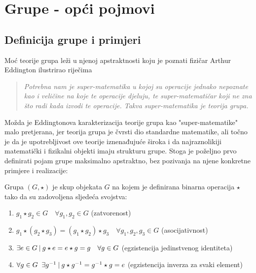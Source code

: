
\chapter{Grupe - opći pojmovi}

\section{Definicija grupe i primjeri}


Moć teorije grupa leži u njenoj apstraktnosti koju je poznati fizičar Arthur
Eddington ilustrirao 
riječima
\begin{quote}
\emph{Potrebna nam je super-matematika u kojoj su operacije jednako nepoznate kao i
veličine na koje te operacije djeluju, te super-matematičar koji ne zna što radi kada
izvodi te operacije. Takva super-matematika je teorija grupa.}
\end{quote}
Možda je Eddingtonova karakterizacija teorije grupa kao "super-matematike" malo pretjerana, jer
teorija grupa je čvrsti dio standardne matematike, ali točno je da je upotrebljivost
ove teorije iznenađujuće široka i da najraznolikiji matematički i fizikalni objekti
imaju strukturu grupe.
Stoga je poželjno prvo definirati pojam grupe maksimalno apstraktno, bez pozivanja
na njene konkretne primjere i realizacije:

\begin{definicija}[Grupa] 
    \label{def:grupa}
Grupa $(G,\star)$ je skup objekata $G$ na kojem je definirana binarna operacija
 $\star$ tako da su zadovoljena sljedeća svojstva:
\begin{enumerate}
\item $g_1 \star g_2 \in G \quad \forall  g_1, g_2 \in G$  (zatvorenost)
\item $ g_1 \star (g_2 \star g_3) = (g_1 \star  g_2)\star g_3 \quad \forall 
    g_1, g_2, g_3 \in G$  (asocijativnost)
\item $\exists e \in G \: | \: g\star e = e \star g = g \quad \forall g\in G$
    (egzistencija jedinstvenog identiteta)
\item $\forall g\in G \;\; \exists g^{-1} \: | \: g\star g^{-1} = g^{-1}\star g =e$
    (egzistencija inverza za svaki element)
\end{enumerate}
\end{definicija}

